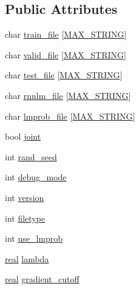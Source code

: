 \subsection*{Public Attributes}
\begin{DoxyCompactItemize}
\item 
char \hyperlink{class_c_rnn_l_m_ae303b5893c71fd719a7eb195f8969904}{train\+\_\+file} \mbox{[}\hyperlink{rnnlmlib_8h_ab5187269936538ffb8ccbbe7115ffdbc}{M\+A\+X\+\_\+\+S\+T\+R\+I\+NG}\mbox{]}
\item 
char \hyperlink{class_c_rnn_l_m_a306dd565a7cd3a7e78227c408ffa394b}{valid\+\_\+file} \mbox{[}\hyperlink{rnnlmlib_8h_ab5187269936538ffb8ccbbe7115ffdbc}{M\+A\+X\+\_\+\+S\+T\+R\+I\+NG}\mbox{]}
\item 
char \hyperlink{class_c_rnn_l_m_ae07eea1cd07d154ccaeb4cfc5c4f5373}{test\+\_\+file} \mbox{[}\hyperlink{rnnlmlib_8h_ab5187269936538ffb8ccbbe7115ffdbc}{M\+A\+X\+\_\+\+S\+T\+R\+I\+NG}\mbox{]}
\item 
char \hyperlink{class_c_rnn_l_m_a3ec8fbcecea020938513a5e3546bfbf8}{rnnlm\+\_\+file} \mbox{[}\hyperlink{rnnlmlib_8h_ab5187269936538ffb8ccbbe7115ffdbc}{M\+A\+X\+\_\+\+S\+T\+R\+I\+NG}\mbox{]}
\item 
char \hyperlink{class_c_rnn_l_m_a1effb774075f3f4e0e6b3c0bda6fd330}{lmprob\+\_\+file} \mbox{[}\hyperlink{rnnlmlib_8h_ab5187269936538ffb8ccbbe7115ffdbc}{M\+A\+X\+\_\+\+S\+T\+R\+I\+NG}\mbox{]}
\item 
bool \hyperlink{class_c_rnn_l_m_a8daf731b007a23d5625f21f47467b73d}{joint}
\item 
int \hyperlink{class_c_rnn_l_m_ae74feac6f8ba9fbc03c10918551ed838}{rand\+\_\+seed}
\item 
int \hyperlink{class_c_rnn_l_m_a8e15b3cac14bd6d3e3510e2676e271dc}{debug\+\_\+mode}
\item 
int \hyperlink{class_c_rnn_l_m_a2b94ddb7cd2afeeb122be9dc9f20b036}{version}
\item 
int \hyperlink{class_c_rnn_l_m_ad77677e2e9a136e99b98eb82eacd868e}{filetype}
\item 
int \hyperlink{class_c_rnn_l_m_aeed9babe07c41579d599c30b31de7701}{use\+\_\+lmprob}
\item 
\hyperlink{rnnlmlib_8h_a11d147c64891830c9e79b3315b1b2e21}{real} \hyperlink{class_c_rnn_l_m_a58ae1c9e2546a3d71783ec8391839acd}{lambda}
\item 
\hyperlink{rnnlmlib_8h_a11d147c64891830c9e79b3315b1b2e21}{real} \hyperlink{class_c_rnn_l_m_a68278346fc2a19cd1f3039a19b816d01}{gradient\+\_\+cutoff}
\item 

\end{DoxyCompactItemize}

